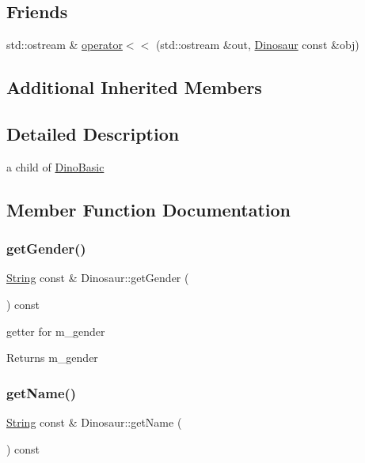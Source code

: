 \subsection*{Friends}
\begin{DoxyCompactItemize}
\item 
std\+::ostream \& \hyperlink{classDinosaur_ab91168c044595ffe09ebf71e598517ca}{operator$<$$<$} (std\+::ostream \&out, \hyperlink{classDinosaur}{Dinosaur} const \&obj)
\end{DoxyCompactItemize}
\subsection*{Additional Inherited Members}


\subsection{Detailed Description}
a child of \hyperlink{classDinoBasic}{Dino\+Basic} 

\subsection{Member Function Documentation}
\mbox{\label{classDinosaur_ad0c54cc970fc58243d2815250ec758c1}} 
\subsubsection{\texorpdfstring{get\+Gender()}{getGender()}}
{\footnotesize\ttfamily \hyperlink{classString}{String} const  \& Dinosaur\+::get\+Gender (\begin{DoxyParamCaption}{ }\end{DoxyParamCaption}) const}

getter for m\+\_\+gender \begin{DoxyReturn}{Returns}
m\+\_\+gender 
\end{DoxyReturn}
\mbox{\label{classDinosaur_a9ee70963c582cdba5f502f238eeaf2ed}} 
\subsubsection{\texorpdfstring{get\+Name()}{getName()}}
{\footnotesize\ttfamily \hyperlink{classString}{String} const  \& Dinosaur\+::get\+Name (\begin{DoxyParamCaption}{ }\end{DoxyParamCaption}) const}


